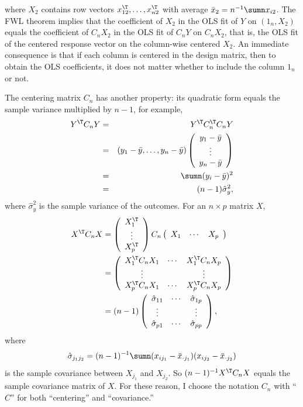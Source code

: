 where $X_{2}$ contains row vectors $x_{12}^{\T},\ldots,x_{n2}^{\T}$ with average $\bar{x}_2 = n^{-1} \sumn x_{i2}$. The FWL
theorem implies that the coefficient of $X_2$ in the OLS fit of $Y$ on $(1_{n},X_{2})$ equals the coefficient of $C_{n}X_{2}$ 
 in the OLS fit of $C_{n}Y$ on $C_{n}X_{2}$,
that is, the OLS fit of the centered response vector on the column-wise
centered $X_{2}.$ An immediate consequence is that if each column is centered in the design matrix, then to obtain the OLS coefficients, it does not matter whether to
include the column $1_{n}$ or not. 

The centering matrix $C_{n}$ has another property: its quadratic
form equals the sample variance multiplied by $n-1$, for example,
\begin{eqnarray*}
Y^{\T}C_{n}Y&=&Y^{\T} C_{n}^{\T} C_{n}Y \\
&=& (y_{1}-\bar{y},\ldots, y_{n}-\bar{y})  \left(\begin{array}{c}
y_{1}-\bar{y}\\
\vdots\\
y_{n}-\bar{y}
\end{array}\right) \\
&=& \sumn(y_{i}-\bar{y})^{2} \\
&=& (n-1) \hat{\sigma}^2_y,
\end{eqnarray*}
where $ \hat{\sigma}^2_y $ is the sample variance of the outcomes. 
For an $n\times p$ matrix $X$, 
\begin{align*}
X^{\T}C_{n}X 
 & =\left(\begin{array}{c}
X_{1}^{\T}\\
\vdots\\
X_{p}^{\T}
\end{array}\right) C_{n}  \left(\begin{array}{ccc}
X_{1} & \cdots & X_{p}\end{array}\right)\\
&= \left(\begin{array}{ccc}
X_1^{\T} C_n X_1 & \cdots & X_1^{\T} C_n X_p \\
\vdots &  & \vdots\\
X_p^{\T} C_n X_1  & \cdots & X_p^{\T} C_n X_p 
\end{array}\right) \\ 
 & =(n-1)\left(\begin{array}{ccc}
\hat{\sigma}_{11} & \cdots & \hat{\sigma}_{1p}\\
\vdots &  & \vdots\\
\hat{\sigma}_{p1} & \cdots & \hat{\sigma}_{pp}
\end{array}\right),
\end{align*}
where 
$$
\hat{\sigma}_{j_{1}j_{2}}=(n-1)^{-1}\sumn(x_{ij_{1}}-\bar{x}_{\cdot j_{1}})(x_{ij_{2}}-\bar{x}_{\cdot j_{2}})
$$
is the sample covariance between $X_{j_{1}}$ and $X_{j_{2}}$. 
So $(n-1)^{-1} X^{\T} C_n X$ equals the sample covariance matrix of $X$. 
For these reason, I choose the notation $C_n$ with ``$C$'' for both ``centering'' and ``covariance.'' 

